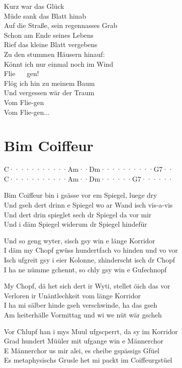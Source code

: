\documentclass[
  letterpaper,
  twoside=false]{scrbook}
\begin{document}
Kurz war das Glück\\
Müde sank das Blatt hinab\\
Auf die Straße, sein regennasses Grab\\
Schon am Ende seines Lebens\\
Rief das kleine Blatt vergebens\\
Zu den stummen Häusern hinauf:\\
Könnt ich nur einmal noch im Wind\\
Flie ~ ~gen!\\
Flög ich hin zu meinem Baum\\
Und vergessen wär der Traum\\
Vom Flie-gen\\
Vom Flie-gen...

\hypertarget{bim-coiffeur}{%
\chapter{Bim Coiffeur}\label{bim-coiffeur}}

\textbar C·······\textbar····Am··\textbar Dm······\textbar····G7··\textbar{}\\
\textbar C·······\textbar····Am··\textbar Dm······\textbar G7······\textbar{}

Bim Coiffeur bin i gsässe vor em Spiegel, luege dry\\
Und gseh dert drinn e Spiegel wo ar Wand isch vis-a-vis\\
Und dert drin spieglet sech dr Spiegel da vor mir\\
Und i däm Spiegel widerum dr Spiegel hindefür

Und so geng wyter, s\textquotesingle isch gsy win e länge Korridor\\
I däm my Chopf gwüss hundertfach vo hinden und vo vor\\
Isch ufgreit gsy i eier Kolonne, z\textquotesingle hinderscht isch dr
Chopf\\
I ha ne nümme gchennt, so chly gsy win e Gufechnopf

My Chopf, dä het sich dert ir Wyti, stellet öich das vor\\
Verloren ir Unäntlechkeit vom länge Korridor\\
I ha mi sälber hinde gseh verschwinde, ha das gseh\\
Am heiterhälle Vormittag und wi we nüt wär gscheh

Vor Chlupf han i mys Muul ufgscperrt, da sy im Korridor\\
Grad hundert Müüler mit ufgange win e Männerchor\\
E Männerchor us mir alei, es cheibe gspässigs Gfüel\\
Es metaphysischs Grusle het mi packt im Coiffeurgstüel
\end{document}
